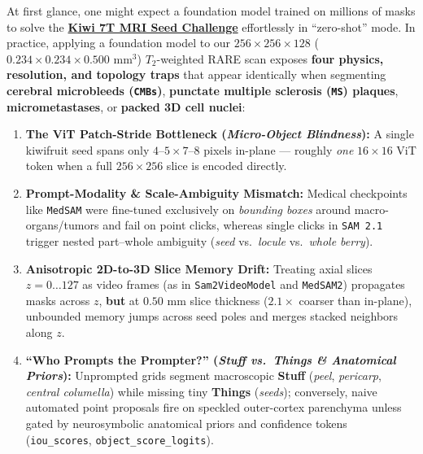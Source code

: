 \documentclass[10.5pt,a4paper]{article}
\begin{document}
At first glance, one might expect a foundation model trained on millions of masks to solve the \href{https://github.com/arvidl/BMED365-2027/tree/main/Lab4-Comp-Imag/Kiwi-challenge}{\textbf{Kiwi 7T MRI Seed Challenge}} effortlessly in ``zero-shot'' mode. In practice, applying a foundation model to our $256 \times 256 \times 128$ ($0.234 \times 0.234 \times 0.500\text{ mm}^3$) $T_2$-weighted RARE scan exposes \textbf{four physics, resolution, and topology traps} that appear identically when segmenting \textbf{cerebral microbleeds (\texttt{CMBs})}, \textbf{punctate multiple sclerosis (\texttt{MS}) plaques}, \textbf{micrometastases}, or \textbf{packed 3D cell nuclei}:
\begin{enumerate}
    \item \textbf{The ViT Patch-Stride Bottleneck (\emph{Micro-Object Blindness}):} A single kiwifruit seed spans only $4\text{--}5 \times 7\text{--}8$ pixels in-plane --- roughly \emph{one} $16 \times 16$ ViT token when a full $256 \times 256$ slice is encoded directly.
    \item \textbf{Prompt-Modality \& Scale-Ambiguity Mismatch:} Medical checkpoints like \texttt{MedSAM} were fine-tuned exclusively on \emph{bounding boxes} around macro-organs/tumors and fail on point clicks, whereas single clicks in \texttt{SAM 2.1} trigger nested part--whole ambiguity (\emph{seed} vs.\ \emph{locule} vs.\ \emph{whole berry}).
    \item \textbf{Anisotropic 2D-to-3D Slice Memory Drift:} Treating axial slices $z = 0 \dots 127$ as video frames (as in \texttt{Sam2VideoModel} and \texttt{MedSAM2}) propagates masks across $z$, \textbf{but} at $0.50\text{ mm}$ slice thickness ($2.1\times$ coarser than in-plane), unbounded memory jumps across seed poles and merges stacked neighbors along $z$.
    \item \textbf{``Who Prompts the Prompter?'' (\emph{Stuff vs.\ Things \& Anatomical Priors}):} Unprompted grids segment macroscopic \textbf{Stuff} (\emph{peel}, \emph{pericarp}, \emph{central columella}) while missing tiny \textbf{Things} (\emph{seeds}); conversely, naive automated point proposals fire on speckled outer-cortex parenchyma unless gated by neurosymbolic anatomical priors and confidence tokens (\texttt{iou\_scores}, \texttt{object\_score\_logits}).
\end{enumerate}
\end{document}
